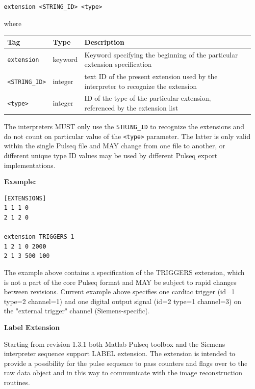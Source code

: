 \documentclass{article}
\begin{document}
\begin{lstlisting}
extension <STRING_ID> <type>
\end{lstlisting}

where 

\begin{tabularx}{\textwidth}{llXl}
\toprule
Tag & Type & Description \\
\midrule
\verb.extension. & keyword & Keyword specifying the beginning of the particular extension specification \\
\verb.<STRING_ID>. & integer & text ID of the present extension used by the interpreter to recognize the extension \\
\verb.<type>. & integer & ID of the type of the particular extension, referenced by the extension list \\
\bottomrule
\end{tabularx}

The interpreters MUST only use the \verb.STRING_ID. to recognize the extensions and do not count on particular value of the \verb.<type>. parameter. The latter is only valid within the single Pulseq file and MAY change from one file to another, or different unique type ID values may be used by different Pulseq export implementations.

\begin{minipage}{\textwidth}
\textbf{Example:}
\begin{lstlisting}
[EXTENSIONS]
1 1 1 0
2 1 2 0

extension TRIGGERS 1
1 2 1 0 2000
2 1 3 500 100
\end{lstlisting}
\end{minipage}

The example above contains a specification of the TRIGGERS extension, which is not a part of the core Pulseq format and MAY be subject to rapid changes between revisions. Current example above specifies one cardiac trigger (id=1 type=2 channel=1) and one digital output signal (id=2 type=1 channel=3) on the "external trigger" channel (Siemens-specific).

\textbf{Label Extension}

Starting from revision 1.3.1 both Matlab Pulseq toolbox and the Siemens interpreter sequence support LABEL extension. The extension is intended to provide a possibility for the pulse sequence to pass counters and flags over to the raw data object and in this way to communicate with the image reconstruction routines. \\ 
\end{document}
